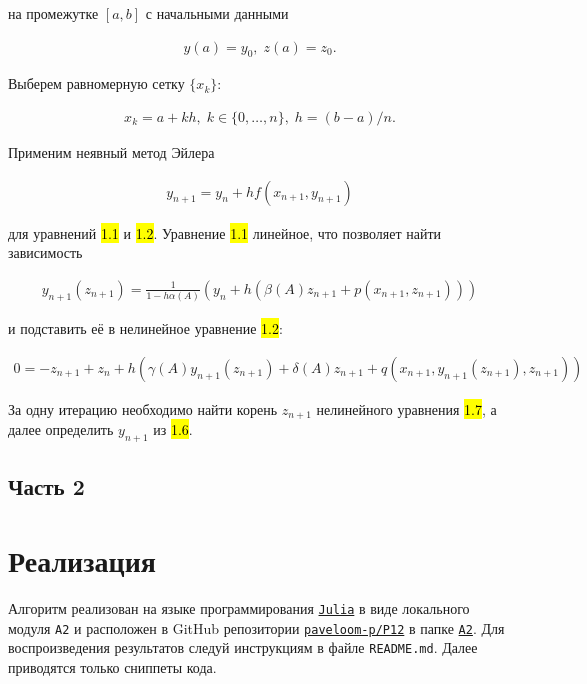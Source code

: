 на промежутке $ [a, b] $ с начальными данными

\hs
\begin{gather}
     y(a) = y_0, \; z(a) = z_0.
\end{gather}

Выберем равномерную сетку $ \{x_k\} $:

\hs
\begin{gather}
x_k = a + kh, \; k \in \{0, \dots, n\}, \; h = (b-a)/n.
\end{gather}

Применим неявный метод Эйлера

\hs
\begin{gather}
y_{n+1} = y_n + h f(x_{n+1}, y_{n+1})
\end{gather}

для уравнений \hl{1.1} и \hl{1.2}. Уравнение \hl{1.1} линейное, что позволяет найти зависимость

\hs
\begin{gather}
y_{n+1}(z_{n+1}) = \frac{1}{1 - h \alpha(A)} (y_n + h (\beta(A) z_{n+1} + p(x_{n+1}, z_{n+1})))
\end{gather}

и подставить её в нелинейное уравнение \hl{1.2}:

\hs
\begin{gather}
0 = - z_{n+1} + z_n + h \left( \gamma(A) y_{n+1}(z_{n+1}) + \delta(A) z_{n+1} + q(x_{n+1}, y_{n+1}(z_{n+1}), z_{n+1}) \right)
\end{gather}

За одну итерацию необходимо найти корень $ z_{n+1} $ нелинейного уравнения \hl{1.7}, а далее определить $ y_{n+1} $ из \hl{1.6}.

\newpage

\subsection*{Часть 2}
\section*{Реализация}

\vspace{18pt}

Алгоритм реализован на языке программирования
\href{https://julialang.org}{\footnotesize \texttt{Julia}} в виде локального модуля {\footnotesize \texttt{A2}}
и расположен в GitHub репозитории \href{https://github.com/paveloom-p/P12}{\footnotesize \texttt{paveloom-p/P12}}
в папке \href{https://github.com/paveloom-p/P12/tree/master/A2}{\footnotesize \texttt{A2}}.
Для воспроизведения результатов следуй инструкциям в файле {\footnotesize \texttt{README.md}}.
Далее приводятся только сниппеты кода.

